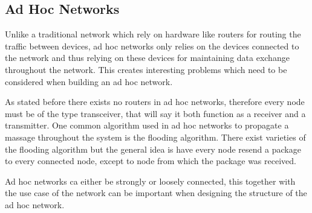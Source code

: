 \subsection{Ad Hoc Networks}
Unlike a traditional network which rely on hardware like routers for routing the traffic between devices, ad hoc networks only relies on the devices connected to the network and thus relying on these devices for maintaining data exchange throughout the network.
This creates interesting problems which need to be considered when building an ad hoc network.

\medskip
As stated before there exists no routers in ad hoc networks, therefore every node must be of the type transceiver, that will say it both function as a receiver and a transmitter.
One common algorithm used in ad hoc networks to propagate a massage  throughout the system is the flooding algorithm.
There exist varieties of the flooding algorithm but the general idea is have every node resend a package to every connected node, except to node from which the package was received.

Ad hoc networks ca either be strongly or loosely connected, this together with the use case of the network can be important when designing the structure of the ad hoc network.

